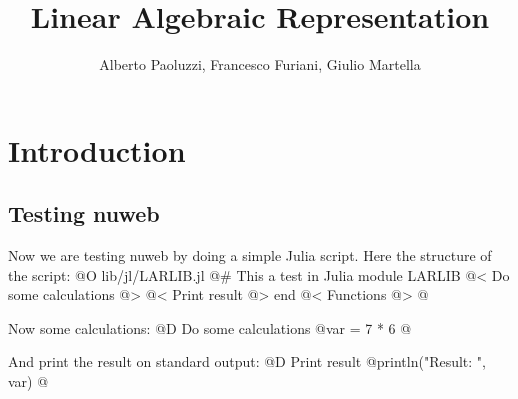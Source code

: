 \documentclass[10pt]{book}
\author{Alberto Paoluzzi, Francesco Furiani, Giulio Martella}
\title{Linear Algebraic Representation}
\begin{document}
\frontmatter
\maketitle
\tableofcontents

\mainmatter

\chapter{Introduction}

\section{Testing nuweb}
Now we are testing nuweb by doing a simple Julia script. Here the structure of the script:
@O lib/jl/LARLIB.jl
@{# This a test in Julia
module LARLIB
@< Do some calculations @>
@< Print result @>
end
@< Functions @>
@}

Now some calculations:
@D Do some calculations
@{var = 7 * 6
@}

And print the result on standard output:
@D Print result
@{println("Result: ", var)
@}
\end{document}
